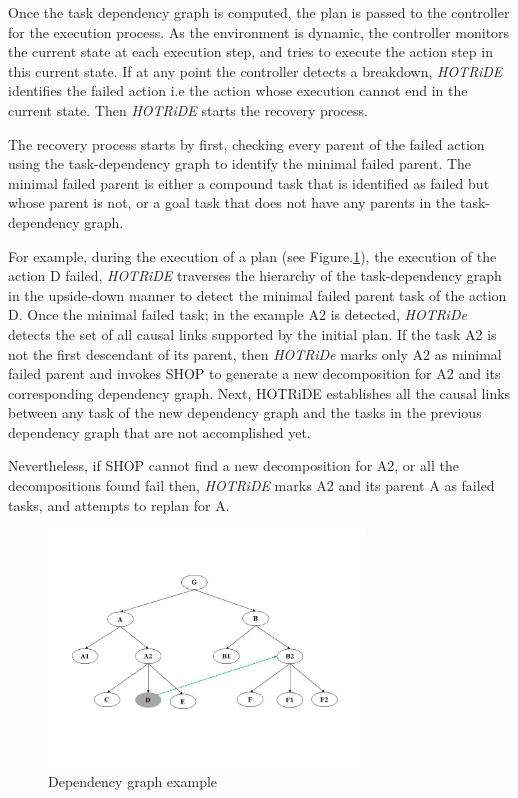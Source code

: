 Once the task dependency graph is computed, the plan is passed to the controller for the execution process. As the environment is dynamic, the controller monitors the current state at each execution step, and tries to execute the action step in this current state.  If at any point the controller detects a breakdown, \textit{HOTRiDE} identifies the failed action i.e the action whose execution cannot end in the current state.  Then \textit{HOTRiDE} starts the recovery process.

The recovery process starts by first, checking every parent of the failed action using the task-dependency graph to identify the minimal failed parent. 
The minimal failed parent is either a compound task that is identified as failed but whose parent is not, or a goal task that does not have any parents in the task-dependency graph.

For example, during the execution of a plan (see Figure.\ref{Dependency graph}), the execution of the action D failed, \textit{HOTRiDE} traverses the hierarchy of the task-dependency graph in the upside-down manner to detect the minimal failed parent task of the action D. 
Once the minimal failed task; in the example A2 is detected, \textit{HOTRiDe} detects the set of all causal links supported by the initial plan.
If the task A2 is not the first descendant of its parent, then \textit{HOTRiDe} marks only A2 as minimal failed parent and invokes SHOP to generate a new decomposition for A2 and its corresponding dependency graph. 
Next, HOTRiDE establishes all  the causal links between any task of the new dependency graph and the tasks in the previous dependency graph that are not accomplished yet. 

Nevertheless, if SHOP cannot find a new decomposition for A2, or all the decompositions found fail then, \textit{HOTRiDE} marks A2 and its parent A as failed tasks, and attempts to replan for A.

\begin{figure}[h]
	\centering
	\includegraphics[width=0.75\textwidth]{Pictures/hotride.png}
	\caption{\label{Dependency graph} Dependency graph example}
\end{figure}

